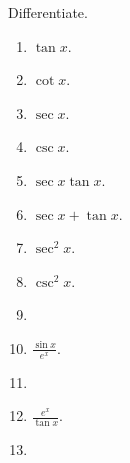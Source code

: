 Differentiate.

\begin{multicols}{2}
\begin{enumerate}
\item $\tan x$.

\item $\cot x$.

\item $\sec x$.

\item $\csc x$.

\item $\sec x\tan x$.

\item $\sec x+\tan x$.

\item $\sec^2 x$.

\item $\csc^2 x$.

\item 
\item $\displaystyle \frac{\sin x}{e^x}$.

\item 
\item $\displaystyle \frac{e^x}{\tan x}$.

\item 
\end{enumerate}

\end{multicols}